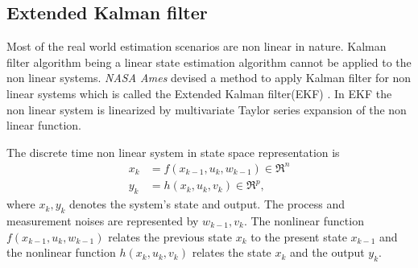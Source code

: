 \subsection{Extended Kalman filter}
\label{subsec:ekf}
Most of the real world estimation scenarios are non linear in nature. Kalman filter algorithm  being a linear state estimation algorithm cannot be applied to the non linear systems. \emph{NASA Ames} devised a method to apply Kalman filter for non linear systems which is called the Extended Kalman filter(EKF) \citep{ekf85}. In EKF the non linear system is linearized by multivariate Taylor series expansion of the non linear function. 

The discrete time non linear system in state space representation is
\begin{equation}
\label{eq:nl_disc}
\begin{split}
x_{k} &= f(x_{k-1},u_k,w_{k-1}) \in \Re^{n}\\
y_k &= h(x_k,u_k,v_k) \in \Re^{p},
\end{split}
\end{equation}
where $x_k,y_k$ denotes the system's state and output. The process and measurement noises are represented by $w_{k-1},v_k$. The nonlinear function $f(x_{k-1},u_k,w_{k-1})$ relates the previous state $x_k$ to the present state $x_{k-1}$ and the nonlinear function $h(x_k,u_k,v_k)$ relates the state $x_k$ and the output $y_k$. 


